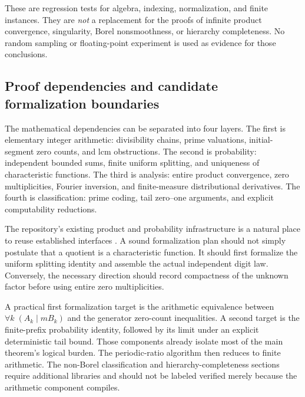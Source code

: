 \documentclass[11pt,a4paper]{article}
\theoremstyle{definition}
\theoremstyle{remark}
\begin{document}
These are regression tests for algebra, indexing, normalization, and
finite instances. They are \emph{not} a replacement for the proofs of
infinite product convergence, singularity, Borel nonsmoothness, or hierarchy
completeness. No random sampling or floating-point experiment is used as
evidence for those conclusions.

\subsection{Proof dependencies and candidate formalization boundaries}
The mathematical dependencies can be separated into four layers. The first
is elementary integer arithmetic: divisibility chains, prime valuations,
initial-segment zero counts, and lcm obstructions. The second is probability:
independent bounded sums, finite uniform splitting, and uniqueness of
characteristic functions. The third is analysis: entire product convergence,
zero multiplicities, Fourier inversion, and finite-measure distributional
derivatives. The fourth is classification: prime coding, tail zero--one
arguments, and explicit computability reductions.

The repository's existing product and probability infrastructure is a
natural place to reuse established interfaces \cite{repo-inverse}. A sound
formalization plan should not simply postulate that a quotient is a
characteristic function. It should first formalize the uniform splitting
identity and assemble the actual independent digit law. Conversely, the
necessary direction should record compactness of the unknown factor before
using entire zero multiplicities.

A practical first formalization target is the arithmetic equivalence between
$\forall k\;(A_k\mid mB_k)$ and the generator zero-count inequalities.
A second target is the finite-prefix probability identity, followed by its
limit under an explicit deterministic tail bound. Those components already
isolate most of the main theorem's logical burden. The periodic-ratio
algorithm then reduces to finite arithmetic. The non-Borel classification
and hierarchy-completeness sections require additional libraries and should
not be labeled verified merely because the arithmetic component compiles.
\end{document}
